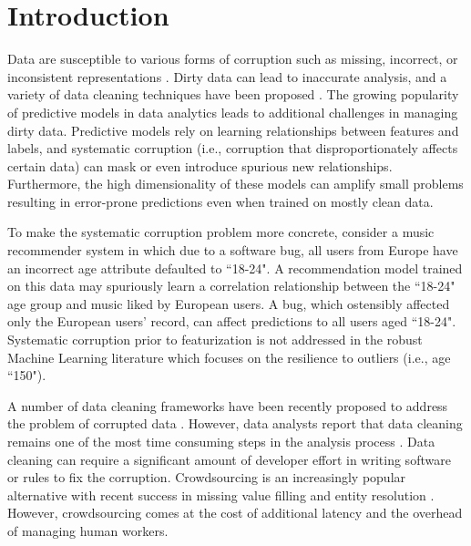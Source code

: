 \section{Introduction}
Data are susceptible to various forms of corruption such as missing, incorrect, or inconsistent representations \cite{Gartner}.
Dirty data can lead to inaccurate analysis, and a variety of data cleaning techniques have been proposed \cite{rahm2000data}.
The growing popularity of predictive models in data analytics \cite{bdas, alexandrov2014stratosphere, crotty2014tupleware, hellerstein2012madlib} leads to additional challenges in managing dirty data.
Predictive models rely on learning relationships between features and labels, and systematic corruption \cite{taylor1982introduction} (i.e., corruption that disproportionately affects certain data) can mask or even introduce spurious new relationships.
Furthermore, the high dimensionality of these models can amplify small problems \cite{xiaofeature} resulting in error-prone predictions even when trained on mostly clean data.

To make the systematic corruption problem more concrete, consider a music recommender system in which due to a software bug, all users from Europe have an incorrect age attribute defaulted to ``18-24".
A recommendation model trained on this data may spuriously learn a correlation relationship between the ``18-24" age group and music liked by European users.
A bug, which ostensibly affected only the European users' record, can affect predictions to all users aged ``18-24".
Systematic corruption prior to featurization is not addressed in the robust Machine Learning literature which focuses on the resilience to outliers (i.e., age ``150").

A number of data cleaning frameworks have been recently proposed to address the problem of corrupted data \cite{khayyat2015bigdansing, chu2015katara, sampleclean}.
However, data analysts report that data cleaning remains one of the most time consuming steps in the analysis process \cite{nytimes}.
Data cleaning can require a significant amount of developer effort in writing software or rules to fix the corruption.
Crowdsourcing is an increasingly popular alternative with recent success in missing value filling and entity resolution \cite{gokhale2014corleone, park2014crowdfill, sampleclean,chu2015katara}.
However, crowdsourcing comes at the cost of additional latency and the overhead of managing human workers.

